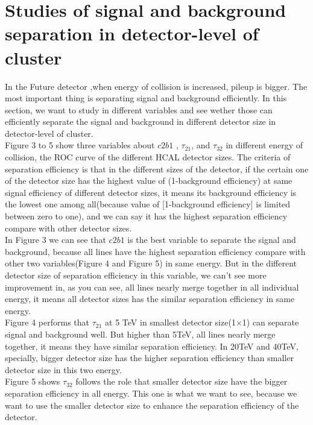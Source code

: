 \section{Studies of signal and background separation in detector-level of cluster}
In the Future detector ,when energy of collision is increased, pileup is bigger. The most important thing is separating signal and background efficiently. In this section, we want to study in different variables and see wether those can efficiently separate the signal and background in different detector size in detector-level of cluster.\\

Figure 3 to 5 show three variables about $c2b1$ , $\tau_{21}$, and $\tau_{32}$ in different energy of collision, the ROC curve of the different HCAL detector sizes. The criteria of separation efficiency is that in the different sizes of the detector, if the certain one of the detector size has the highest value of (1-background efficiency) at same signal efficiency of different detector sizes, it means its background efficiency is the lowest one among all(because value of [1-background efficiency] is limited between zero to one), and we can say it has the highest separation efficiency compare with other detector sizes.\\

In Figure 3 we can see that $c2b1$ is the best variable to separate the signal and background, because all lines have the highest separation efficiency compare with other two variables(Figure 4 and Figure 5) in same energy. But in the different detector size of separation efficiency in this variable, we can't see more improvement in, as you can see, all lines nearly merge together in all individual energy, it means all detector sizes has the similar separation efficiency in same energy.\\

Figure 4 performs that $\tau_{21}$ at 5 TeV in smallest detector size(1$\times$1) can separate signal and background well. But higher than 5TeV, all lines nearly merge together, it means they have similar separation efficiency. In 20TeV and 40TeV, specially, bigger detector size has the higher separation efficiency than smaller detector size in this two energy.\\

Figure 5 shows $\tau_{32}$ follows the role that smaller detector size have the bigger separation efficiency in all energy. This one is what we want to see, because we want to use the smaller detector size to enhance the separation efficiency of the detector.\\

